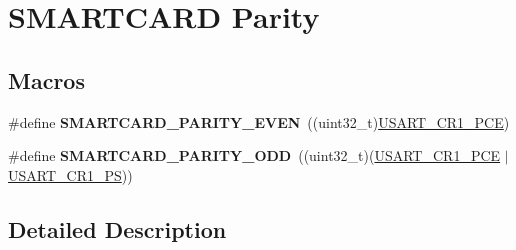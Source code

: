 \hypertarget{group___s_m_a_r_t_c_a_r_d___parity}{}\section{S\+M\+A\+R\+T\+C\+A\+RD Parity}
\label{group___s_m_a_r_t_c_a_r_d___parity}
\subsection*{Macros}
\begin{DoxyCompactItemize}
\item 
\#define {\bfseries S\+M\+A\+R\+T\+C\+A\+R\+D\+\_\+\+P\+A\+R\+I\+T\+Y\+\_\+\+E\+V\+EN}~((uint32\+\_\+t)\hyperlink{group___peripheral___registers___bits___definition_ga60f8fcf084f9a8514efafb617c70b074}{U\+S\+A\+R\+T\+\_\+\+C\+R1\+\_\+\+P\+CE})\hypertarget{group___s_m_a_r_t_c_a_r_d___parity_ga94ae871b29c18b59dab9a045443d11c8}{}\label{group___s_m_a_r_t_c_a_r_d___parity_ga94ae871b29c18b59dab9a045443d11c8}

\item 
\#define {\bfseries S\+M\+A\+R\+T\+C\+A\+R\+D\+\_\+\+P\+A\+R\+I\+T\+Y\+\_\+\+O\+DD}~((uint32\+\_\+t)(\hyperlink{group___peripheral___registers___bits___definition_ga60f8fcf084f9a8514efafb617c70b074}{U\+S\+A\+R\+T\+\_\+\+C\+R1\+\_\+\+P\+CE} $\vert$ \hyperlink{group___peripheral___registers___bits___definition_ga2e159d36ab2c93a2c1942df60e9eebbe}{U\+S\+A\+R\+T\+\_\+\+C\+R1\+\_\+\+PS}))\hypertarget{group___s_m_a_r_t_c_a_r_d___parity_gaef2239030beeb07577e43965b013f65d}{}\label{group___s_m_a_r_t_c_a_r_d___parity_gaef2239030beeb07577e43965b013f65d}

\end{DoxyCompactItemize}


\subsection{Detailed Description}
